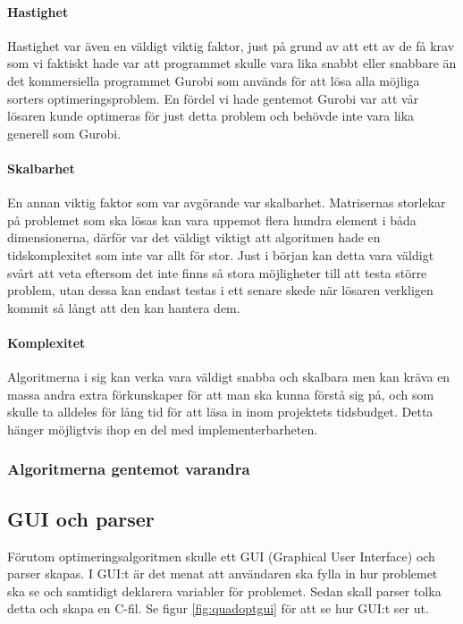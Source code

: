\paragraph{Hastighet}
Hastighet var även en väldigt viktig faktor, just på grund av att ett av de få krav som vi faktiskt hade var att programmet skulle vara lika snabbt eller snabbare än det kommersiella programmet Gurobi som används för att lösa alla möjliga sorters optimeringsproblem. En fördel vi hade gentemot Gurobi var att vår lösaren kunde optimeras för just detta problem och behövde inte vara lika generell som Gurobi.

\paragraph{Skalbarhet}
En annan viktig faktor som var avgörande var skalbarhet. Matrisernas storlekar på problemet som ska lösas kan vara uppemot flera hundra element i båda dimensionerna, därför var det väldigt viktigt att algoritmen hade en tidskomplexitet som inte var allt för stor. Just i början kan detta vara väldigt svårt att veta eftersom det inte finns så stora möjligheter till att testa större problem, utan dessa kan endast testas i ett senare skede när lösaren verkligen kommit så långt att den kan hantera dem.

\paragraph{Komplexitet}
Algoritmerna i sig kan verka vara väldigt snabba och skalbara men kan kräva en massa andra extra förkunskaper för att man ska kunna förstå sig på, och som skulle ta alldeles för lång tid för att läsa in inom projektets tidsbudget. Detta hänger möjligtvis ihop en del med implementerbarheten.

\subsubsection{Algoritmerna gentemot varandra}

\subsection{GUI och parser}
Förutom optimeringsalgoritmen skulle ett GUI (Graphical User Interface) och parser skapas. I GUI:t är det menat att användaren ska fylla in hur problemet ska se och samtidigt deklarera variabler för problemet. Sedan skall parser tolka detta och skapa en C-fil. Se figur \ref{fig:quadoptgui} för att se hur GUI:t ser ut.

